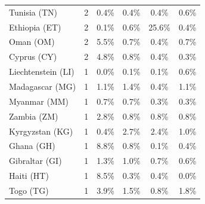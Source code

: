 {\begin{table}[ht]
{\begin{tabular}{lccccc}
Tunisia (TN)          &     2  & \cellcolor{green0} 0.4\% & 0.4\% & \cellcolor{green0} 0.4\% & \cellcolor{red1} 0.6\% \\  %
Ethiopia (ET)         &     2  & \cellcolor{green0} 0.1\% & \cellcolor{green0} 0.6\% & \cellcolor{red5}  25.6\% & \cellcolor{green0} 0.4\% \\  %
Oman (OM)             &     2  & \cellcolor{red5}  5.5\% & \cellcolor{green0} 0.7\% & \cellcolor{green0} 0.4\% & \cellcolor{green0} 0.7\% \\  %
Cyprus (CY)           &     2  & \cellcolor{red5}  4.8\% & \cellcolor{green0} 0.8\% & \cellcolor{green0} 0.4\% & \cellcolor{green0} 0.3\% \\  %
Liechtenstein (LI)    &     1  & \cellcolor{green5}  0.0\% & \cellcolor{green0} 0.1\% & \cellcolor{green0} 0.1\% & \cellcolor{red5}  0.6\% \\  %
Madagascar (MG)       &     1  & \cellcolor{red0} 1.1\% & \cellcolor{red5}  1.4\% & \cellcolor{green5}  0.4\% & \cellcolor{red0} 1.1\% \\  %
Myanmar (MM)          &     1  & \cellcolor{red5}  0.7\% & \cellcolor{red5}  0.7\% & \cellcolor{green5}  0.3\% & \cellcolor{green5}  0.3\% \\  %
Zambia (ZM)           &     1  & \cellcolor{red5}  2.8\% & \cellcolor{green1} 0.8\% & \cellcolor{green1} 0.8\% & \cellcolor{green1} 0.8\% \\  %
Kyrgyzstan (KG)       &     1  & \cellcolor{green5}  0.4\% & \cellcolor{red5}  2.7\% & \cellcolor{red2} 2.4\% & \cellcolor{green1} 1.0\% \\  %
Ghana (GH)            &     1  & \cellcolor{red5}  8.8\% & \cellcolor{green0} 0.8\% & \cellcolor{green1} 0.1\% & \cellcolor{green1} 0.4\% \\  %
Gibraltar (GI)        &     1  & \cellcolor{red5}  1.3\% & \cellcolor{red0} 1.0\% & \cellcolor{green1} 0.7\% & \cellcolor{green5}  0.6\% \\  %
Haiti (HT)            &     1  & \cellcolor{red5}  8.5\% & \cellcolor{green1} 0.3\% & \cellcolor{green1} 0.4\% & \cellcolor{green1} 0.0\% \\  %
Togo (TG)             &     1  & \cellcolor{red5}  3.9\% & \cellcolor{green0} 1.5\% & \cellcolor{green5}  0.8\% & 1.8\% \\  %

\end{tabular}}
\end{table}}
